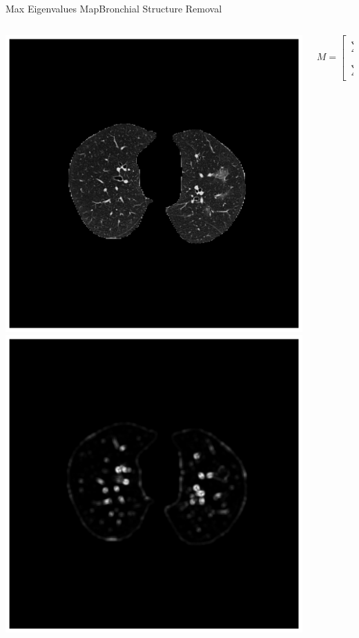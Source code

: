 \documentclass{standalone}
\begin{document}
	\begin{frame}[noframenumbering]{Max Eigenvalues Map}{Bronchial Structure Removal}
		\begin{columns}[b]
		
			\begin{column}{.4\textwidth}
				\centering\includegraphics[width=.7\linewidth]{./img/Lung_2}
				\centering\includegraphics[width=.7\linewidth]{./img/eigmap}
			\end{column}
			\begin{column}{.4\textwidth}

				\begin{equation*}
					M = \begin{bmatrix} \sum _{S(p)}(\frac{dI}{dx})^2 & \sum _{S(p)}\frac{dI}{dx}\frac{dI}{dy} \\ \sum _{S(p)}\frac{dI}{dx}\frac{dI}{dx}& \sum _{S(p)}(\frac{dI}{dy})^2 \end{bmatrix}
				\end{equation*}
		

\end{column}
\end{columns}
\end{frame}
\end{document}
